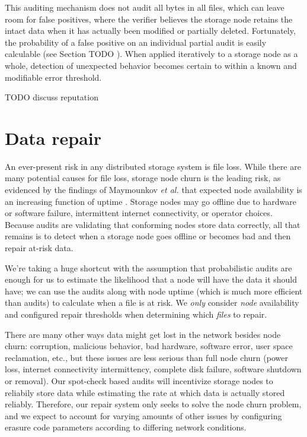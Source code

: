 \documentclass[11pt,fleqn,openany]{book}
\newcommand{\todo}[1]{{\color{red} TODO #1 }}
\begin{document}
This auditing mechanism does not audit all bytes in all files, which can
leave room for false positives, where the verifier believes the storage node
retains the intact data when it has actually been modified or partially
deleted. Fortunately, the probability of a false positive on an individual
partial audit is easily calculable (see Section \todo{}). When applied
iteratively to a storage node as a whole, detection of unexpected behavior
becomes certain to within a known and modifiable error threshold.

\todo{discuss reputation}

\section{Data repair}

An ever-present risk in any distributed storage system is file loss. While there
are many potential causes for file loss, storage node churn is the leading
risk, as evidenced by the findings of Maymounkov {\em et al.} that expected node
availability is an increasing function of uptime \cite{kad}. Storage nodes
may go offline due to hardware or software failure, intermittent internet
connectivity, or operator choices.
Because audits are validating that conforming nodes store data correctly, all
that remains is to detect when a storage node goes offline or becomes bad and
then repair at-risk data.

We're taking a huge shortcut with the assumption that
probabilistic audits are enough for us to estimate the likelihood that a node
will have the data it should have; we can use the audits
along with node uptime (which is much more efficient than audits)
to calculate when a file is at risk.
We {\em only} consider {\em node} availability and configured repair thresholds
when determining which {\em files} to repair.

There are many other ways data might get lost in the network besides node churn:
corruption, malicious behavior, bad hardware, software error, user space
reclamation, etc., but these issues are less serious than full node
churn (power loss, internet connectivity intermittency, complete disk failure,
software shutdown or removal).
Our spot-check based audits will incentivize storage nodes to reliabily store
data
while estimating the rate at which data is actually stored reliably.
Therefore, our repair system only seeks to solve the node churn problem, and
we expect to account for varying
amounts of other issues by configuring erasure code
parameters according to differing network conditions.
\end{document}
